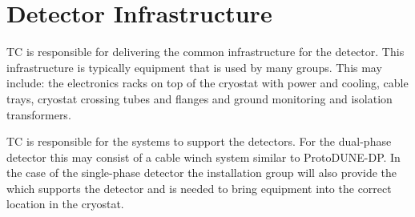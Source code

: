 \section{Detector Infrastructure}
\label{sec:fdsp-coord-infrastructure}

TC is responsible for delivering the common infrastructure for the
detector. This infrastructure is typically equipment that is used by
many groups. This may include: the electronics racks on top of the
cryostat with power and cooling, cable trays, cryostat crossing
tubes and flanges and ground monitoring and isolation transformers.

TC is responsible for the systems to support the detectors. For the
dual-phase detector this may consist of a cable winch system similar
to ProtoDUNE-DP.  In the case of the single-phase detector the
installation group will also provide the  which supports
the detector and is needed to bring equipment into the correct
location in the cryostat.

%
